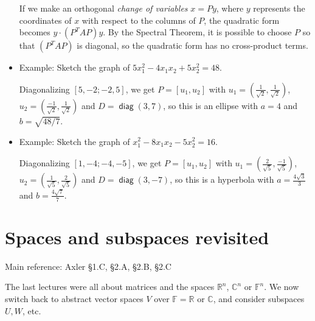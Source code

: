 \documentclass[11pt]{article}
\newcommand{\1}{\mathbf{1}}
\newcommand{\0}{\mathbf{0}}
\newcommand{\C}{\mathbb{C}}
\newcommand{\F}{\mathbb{F}}
\newcommand{\R}{\mathbb{R}}
\DeclareMathOperator{\mydiag}{\mathsf{diag}}
\DeclareMathOperator{\mydot}{\boldsymbol{\cdot}}
\begin{document}
\begin{itemize}
If we make an orthogonal \emph{change of variables} $x = Py$, where $y$ represents the coordinates of $x$ with respect to the columns of $P$, the quadratic form becomes $y \mydot (P^T\! AP)y$. By the Spectral Theorem, it is possible to choose $P$ so that $ (P^T\! AP) $ is diagonal, so the quadratic form has no cross-product terms.

\item

Example:
Sketch the graph of $5x_1^2 - 4 x_1x_2 + 5x_2^2 = 48$.

Diagonalizing
$ [ 5, -2 ; -2, 5 ] $,
we get
$P = [u_1, u_2]$ with
$u_1 = (\frac{1}{\sqrt{2}},\frac{1}{\sqrt{2}})$,
$u_2 = (\frac{-1}{\sqrt{2}},\frac{1}{\sqrt{2}})$
and
$D=\mydiag(3,7)$,
so this is an ellipse with $a=4$ and $ b=\sqrt{48/7} $.

\item

Example:
Sketch the graph of $x_1^2 - 8 x_1x_2 - 5x_2^2 = 16$.

Diagonalizing
$ [1, -4 ; -4, -5 ] $,
we get
$P = [u_1, u_2]$ with
$u_1 = (\frac{2}{\sqrt{5}},\frac{-1}{\sqrt{5}})$,
$u_2 = (\frac{1}{\sqrt{5}},\frac{2}{\sqrt{5}})$
and
$D=\mydiag(3,-7)$,
so this is a hyperbola with $a=\frac{4\sqrt{3}}{3}$ and $b=\frac{4\sqrt{7}}{7}$.

\end{itemize}


\clearpage
\section{Spaces and subspaces revisited}

Main reference:
Axler \S1.C, \S2.A, \S2.B, \S2.C

The last lectures were all about matrices and the spaces $\R^n$, $\C^n$ or $\F^n$.
We now switch back to abstract vector spaces $V$ over $\F = \R \text{ or } \C$, and consider subspaces $U,W$, etc.
\end{document}
